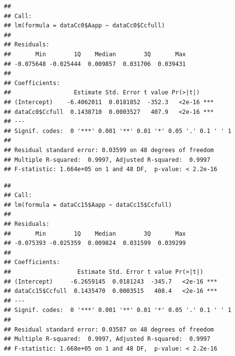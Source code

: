 \documentclass[
]{krantz}
\makeatletter
\newenvironment{Shaded}{\begin{snugshade}}{\end{snugshade}}
\newcommand{\DecValTok}[1]{\textcolor[rgb]{0.00,0.00,0.81}{#1}}
\newcommand{\FunctionTok}[1]{\textcolor[rgb]{0.00,0.00,0.00}{#1}}
\newcommand{\NormalTok}[1]{#1}
\newcommand{\OtherTok}[1]{\textcolor[rgb]{0.56,0.35,0.01}{#1}}
\newcommand{\SpecialCharTok}[1]{\textcolor[rgb]{0.00,0.00,0.00}{#1}}
\newenvironment{kframe}{%
\medskip{}
\setlength{\fboxsep}{.8em}
 \def\at@end@of@kframe{}%
 \ifinner\ifhmode%
  \def\at@end@of@kframe{\end{minipage}}%
  \begin{minipage}{\columnwidth}%
 \fi\fi%
 \def\FrameCommand##1{\hskip\@totalleftmargin \hskip-\fboxsep
 \colorbox{shadecolor}{##1}\hskip-\fboxsep
     \hskip-\linewidth \hskip-\@totalleftmargin \hskip\columnwidth}%
 \MakeFramed {\advance\hsize-\width
   \@totalleftmargin\z@ \linewidth\hsize
   \@setminipage}}%
 {\par\unskip\endMakeFramed%
 \at@end@of@kframe}
\renewenvironment{Shaded}{\begin{kframe}}{\end{kframe}}
\makeatother
\begin{document}
\begin{verbatim}
## 
## Call:
## lm(formula = dataCc0$Aapp ~ dataCc0$Ccfull)
## 
## Residuals:
##       Min        1Q    Median        3Q       Max 
## -0.075648 -0.025444  0.009857  0.031706  0.039431 
## 
## Coefficients:
##                  Estimate Std. Error t value Pr(>|t|)    
## (Intercept)    -6.4062011  0.0181852  -352.3   <2e-16 ***
## dataCc0$Ccfull  0.1438710  0.0003527   407.9   <2e-16 ***
## ---
## Signif. codes:  0 '***' 0.001 '**' 0.01 '*' 0.05 '.' 0.1 ' ' 1
## 
## Residual standard error: 0.03599 on 48 degrees of freedom
## Multiple R-squared:  0.9997, Adjusted R-squared:  0.9997 
## F-statistic: 1.664e+05 on 1 and 48 DF,  p-value: < 2.2e-16
\end{verbatim}

\begin{Shaded}
\end{Shaded}

\begin{verbatim}
## 
## Call:
## lm(formula = dataCc15$Aapp ~ dataCc15$Ccfull)
## 
## Residuals:
##       Min        1Q    Median        3Q       Max 
## -0.075393 -0.025359  0.009824  0.031599  0.039299 
## 
## Coefficients:
##                   Estimate Std. Error t value Pr(>|t|)    
## (Intercept)     -6.2659145  0.0181243  -345.7   <2e-16 ***
## dataCc15$Ccfull  0.1435470  0.0003515   408.4   <2e-16 ***
## ---
## Signif. codes:  0 '***' 0.001 '**' 0.01 '*' 0.05 '.' 0.1 ' ' 1
## 
## Residual standard error: 0.03587 on 48 degrees of freedom
## Multiple R-squared:  0.9997, Adjusted R-squared:  0.9997 
## F-statistic: 1.668e+05 on 1 and 48 DF,  p-value: < 2.2e-16
\end{verbatim}

\begin{Shaded}
\end{Shaded}
\end{document}
